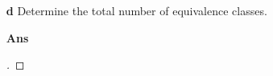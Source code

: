 \documentclass[paper=usletter, fontsize=12pt]{article}
\begin{document}
\begin{itemize}
\begin{itemize}
\begin{itemize}
                \item[\textbf{d}] Determine the total number of equivalence
                classes.
                \item[\textbf{Ans}]
                \begin{proof}[\unskip\nopunct]
                \end{proof}
                \vspace{0.2in}

            \end{itemize}

        \end{itemize}

    \end{itemize}
\end{document}
